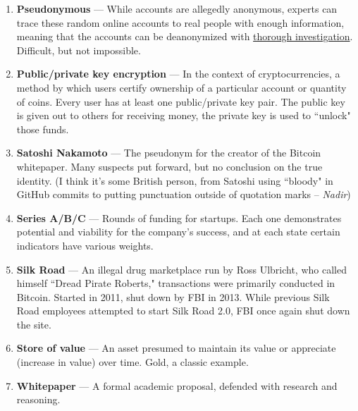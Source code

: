 \documentclass[full.tex]{subfiles}
\begin{document}
\begin{enumerate}
        \item \textbf{Pseudonymous} --- While accounts are allegedly anonymous, experts can trace these random online accounts to real people with enough information, meaning that the accounts can be deanonymized with \underline{thorough investigation}. Difficult, but not impossible.
        
        \newpage %
        
        \item \textbf{Public/private key encryption} --- In the context of cryptocurrencies, a method by which users certify ownership of a particular account or quantity of coins. Every user has at least one public/private key pair. The public key is given out to others for receiving money, the private key is used to ``unlock" those funds.
        
        \item \textbf{Satoshi Nakamoto} --- The pseudonym for the creator of the Bitcoin whitepaper. Many suspects put forward, but no conclusion on the true identity. (I think it's some British person, from Satoshi using ``bloody" in GitHub commits to putting punctuation outside of quotation marks -- \textit{Nadir})
        
        \item \textbf{Series A/B/C} --- Rounds of funding for startups. Each one demonstrates potential and viability for the company's success, and at each state certain indicators have various weights.
        
        \item \textbf{Silk Road} --- An illegal drug marketplace run by Ross Ulbricht, who called himself ``Dread Pirate Roberts," transactions were primarily conducted in Bitcoin. Started in 2011, shut down by FBI in 2013. While previous Silk Road employees attempted to start Silk Road 2.0, FBI once again shut down the site.
        
        \item \textbf{Store of value} --- An asset presumed to maintain its value or appreciate (increase in value) over time. Gold, a classic example.
        
        \item \textbf{Whitepaper} --- A formal academic proposal, defended with research and reasoning.
    \end{enumerate}
\end{document}
